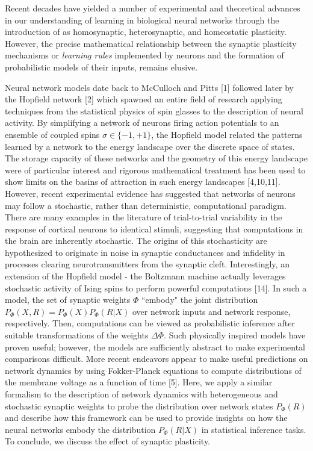 \documentclass{ucetd}
\begin{document}
Recent decades have yielded a number of experimental and theoretical advances in our understanding of learning in biological neural networks through the introduction of as homosynaptic, heterosynaptic, and homeostatic plasticity. However, the precise mathematical relationship between the synaptic plasticity mechanisms or \emph{learning rules} implemented by neurons and the formation of probabilistic models of their inputs, remains elusive.

Neural network models date back to McCulloch and Pitts [1] followed later by the Hopfield network [2] which spawned an entire field of research applying techniques from the statistical physics of spin glasses to the description of neural activity. By simplifying a network of neurons firing action potentials to an ensemble of coupled spins $\sigma \in \{-1, +1\}$, the Hopfield model related the patterns learned by a network to the energy landscape over the discrete space of states. The storage capacity of these networks and the geometry of this energy landscape were of particular interest and rigorous mathematical treatment has been used to show limits on the basins of attraction in such energy landscapes [4,10,11]. However, recent experimental evidence has suggested that networks of neurons may follow a stochastic, rather than deterministic, computational paradigm. There are many examples in the literature of trial-to-trial variability in the response of cortical neurons to identical stimuli, suggesting that computations in the brain are inherently stochastic. The origins of this stochasticity are hypothesized to originate in noise in synaptic conductances and infidelity in processes clearing neurotransmitters from the synaptic cleft. Interestingly, an extension of the Hopfield model - the Boltzmann machine actually leverages stochastic activity of Ising spins to perform powerful computations [14]. In such a model, the set of synaptic weights $\Phi$ ``embody" the joint distribution $P_{\Phi}(X,R) = P_{\Phi}(X)P_{\Phi}(R|X)$ over network inputs and network response, respectively. Then, computations can be viewed as probabilistic inference after suitable transformations of the weights $\Delta\Phi$. Such physically inspired models have proven useful; however, the models are sufficiently abstract to make experimental comparisons difficult. More recent endeavors appear to make useful predictions on network dynamics by using Fokker-Planck equations to compute distributions of the membrane voltage as a function of time [5]. Here, we apply a similar formalism to the description of network dynamics with heterogeneous and stochastic synaptic weights to probe the distribution over network states $P_{\Phi}(R)$ and describe how this framework can be used to provide insights on how the neural networks embody the distribution $P_{\Phi}(R|X)$ in statistical inference tasks. To conclude, we discuss the effect of synaptic plasticity.
\end{document}
